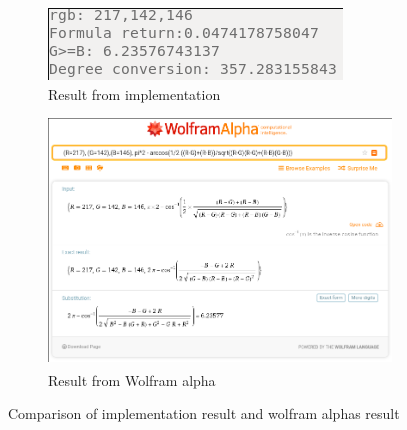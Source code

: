 \documentclass{article}
\newcommand{\goodcite}[1]{\textsuperscript{\cite{#1}}}
\begin{document}
\begin{figure}[H]
\centering
\begin{subfigure}{.5\textwidth}
  \centering
  \includegraphics[width=0.9\linewidth]{img/rgb-217-142-146-code.png}
    \caption{Result from implementation}
  \label{fig:217_code}
\end{subfigure}%
\begin{subfigure}{.5\textwidth} 
  \centering
  \includegraphics[width=0.9\linewidth]{img/rgb-217-142-146-wolfram.png}
    \caption{Result from Wolfram alpha\goodcite{Wolfram}}
  \label{fig:217_wolfram}
\end{subfigure}
\caption{Comparison of implementation result and wolfram alphas result}
\label{fig:Comparison-217}
\end{figure}
\end{document}
